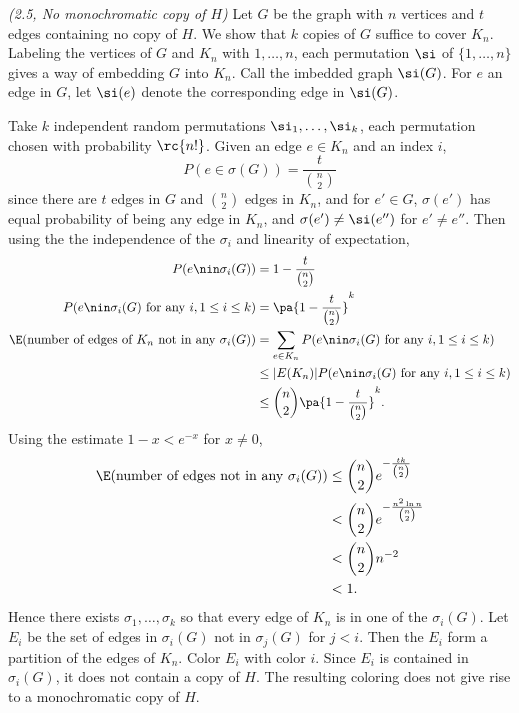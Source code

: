 \begin{problem} {\it (2.5, No monochromatic copy of $H$)}
Let $G$ be the graph with $n$ vertices and $t$ edges containing no copy of $H$. 
We show that $k$ copies of $G$ suffice to cover $K_n$. Labeling the vertices of $G$ and $K_n$ with $1,\ldots, n$, each permutation $\si$ of $\{1,\ldots, n\}$ gives a way of embedding $G$ into $K_n$. Call the imbedded graph $\si(G)$. For $e$ an edge in $G$, let $\si(e)$ denote the corresponding edge in $\si(G)$.

Take $k$ independent random permutations $\si_1,\ldots, \si_k$, each permutation chosen with probability $\rc{n!}$. Given an edge $e\in K_n$ and an index $i$,
\[
P(e\in \sigma(G))=\frac{t}{\binom n2}
\]
since there are $t$ edges in $G$ and $\binom n2$ edges in $K_n$, and for $e'\in G$, $\sigma(e')$ has equal probability of being any edge in $K_n$, and $\sigma(e')\neq \si(e'')$ for $e'\neq e''$. Then using the the independence of the $\sigma_i$ and linearity of expectation,
\begin{align*}
P(e\nin \sigma_i(G))&=1-\frac{t}{\binom n2}\\
P(e\nin \sigma_i(G)\text{ for any }i,1\leq i\leq k)&=\pa{1-\frac{t}{\binom n2}}^k\\
\E(\text{number of edges of }K_n\text{ not in any }\sigma_i(G))
&=\sum_{e\in K_n}P(e\nin \sigma_i(G)\text{ for any }i,1\leq i\leq k)\\
&\leq |E(K_n)|P(e\nin \sigma_i(G)\text{ for any }i,1\leq i\leq k)\\
&\leq \binom n2\pa{1-\frac{t}{\binom n2}}^k.
\end{align*}
Using the estimate $1-x<e^{-x}$ for $x\neq 0$, 
\begin{align*}
\E(\text{number of edges not in any }\sigma_i(G))
&\leq \binom n2 e^{-\frac{tk}{\binom n2}}\\
&<\binom n2 e^{-\frac{n^2\ln n}{\binom n2}}\\
&<\binom n2n^{-2}\\
&<1.
\end{align*}
Hence there exists $\sigma_1,\ldots, \sigma_k$ so that every edge of $K_n$ is in one of the $\sigma_i(G)$. Let $E_i$ be the set of edges in $\sigma_i(G)$ not in $\sigma_j(G)$ for $j<i$. Then the $E_i$ form a partition of the edges of $K_n$. Color $E_i$ with color $i$. Since $E_i$ is contained in $\sigma_i(G)$, it does not contain a copy of $H$. The resulting coloring does not give rise to a monochromatic copy of $H$.
\end{problem}
